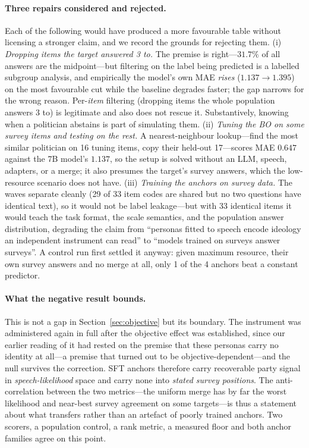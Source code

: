 \documentclass[11pt,letterpaper]{article}
\begin{document}
\paragraph{Three repairs considered and rejected.} Each of the following would have produced a more favourable table without licensing a stronger claim, and we record the grounds for rejecting them. (i) \emph{Dropping items the target answered 3 to.} The premise is right---$31.7\%$ of all answers are the midpoint---but filtering on the label being predicted is a labelled subgroup analysis, and empirically the model's own MAE \emph{rises} ($1.137\rightarrow1.395$) on the most favourable cut while the baseline degrades faster; the gap narrows for the wrong reason. Per-\emph{item} filtering (dropping items the whole population answers 3 to) is legitimate and also does not rescue it. Substantively, knowing when a politician abstains is part of simulating them. (ii) \emph{Tuning the BO on some survey items and testing on the rest.} A nearest-neighbour lookup---find the most similar politician on 16 tuning items, copy their held-out 17---scores MAE $0.647$ against the 7B model's $1.137$, so the setup is solved without an LLM, speech, adapters, or a merge; it also presumes the target's survey answers, which the low-resource scenario does not have. (iii) \emph{Training the anchors on survey data.} The waves separate cleanly (29 of 33 item codes are shared but no two questions have identical text), so it would not be label leakage---but with 33 identical items it would teach the task format, the scale semantics, and the population answer distribution, degrading the claim from ``personas fitted to speech encode ideology an independent instrument can read'' to ``models trained on surveys answer surveys''. A control run first settled it anyway: given maximum resource, their own survey answers and no merge at all, only 1 of the 4 anchors beat a constant predictor.

\paragraph{What the negative result bounds.} This is not a gap in Section~\ref{sec:objective} but its boundary. The instrument was administered again in full after the objective effect was established, since our earlier reading of it had rested on the premise that these personas carry no identity at all---a premise that turned out to be objective-dependent---and the null survives the correction. SFT anchors therefore carry recoverable party signal in \emph{speech-likelihood} space and carry none into \emph{stated survey positions}. The anti-correlation between the two metrics---the uniform merge has by far the worst likelihood and near-best survey agreement on some targets---is thus a statement about what transfers rather than an artefact of poorly trained anchors. Two scorers, a population control, a rank metric, a measured floor and both anchor families agree on this point.
\end{document}

